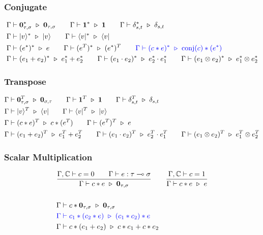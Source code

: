 \subsubsection*{Conjugate}
\begin{align*}
  & \Gamma \vdash \textbf{0}_{\tau, \sigma}^* \ \triangleright\ \textbf{0}_{\tau, \sigma}
  \qquad 
  \Gamma \vdash \mathbf{1}^* \ \triangleright\ \mathbf{1}
  \qquad 
  \Gamma \vdash \delta_{s,t}^* \ \triangleright\ \delta_{s,t}\\
  & \Gamma \vdash \ket{v}^* \ \triangleright\ \ket{v}
  \qquad 
  \Gamma \vdash \bra{v}^* \ \triangleright\ \bra{v} \\
  & \Gamma \vdash (e^*)^*\ \triangleright\ e
  \qquad 
  \Gamma \vdash (e^T)^* \ \triangleright\ (e^*)^T
  \qquad 
  \textcolor{blue}{\Gamma \vdash (c * e)^* \ \triangleright\ \textrm{conj}(c) * (e^*)}\\
  & \Gamma \vdash (e_1 + e_2)^* \ \triangleright\ e_1^* + e_2^* 
  \qquad \Gamma \vdash (e_1 \cdot e_2)^* \ \triangleright\ e_2^* \cdot e_1^* 
  \qquad \Gamma \vdash (e_1 \otimes e_2)^* \ \triangleright\ e_1^* \otimes e_2^*
\end{align*}

\subsubsection*{Transpose}
\begin{align*}
  & \Gamma \vdash \textbf{0}_{\tau, \sigma}^T \ \triangleright\ \textbf{0}_{\sigma, \tau} 
  \qquad \Gamma \vdash \mathbf{1}^T \ \triangleright\ \mathbf{1}
  \qquad \Gamma \vdash \delta_{s,t}^T \ \triangleright\ \delta_{s,t} \\
  & \Gamma \vdash \ket{v}^T \ \triangleright\ \bra{v} 
  \qquad \Gamma \vdash \bra{v}^T \ \triangleright\ \ket{v} \\
  & \Gamma \vdash (c * e)^T \ \triangleright\ c * (e^T)
  \qquad \Gamma \vdash (e^T)^T \ \triangleright\ e\\
  & \Gamma \vdash (e_1 + e_2)^T \ \triangleright\ e_1^T + e_2^T 
  \qquad \Gamma \vdash (e_1 \cdot e_2)^T \ \triangleright\ e_2^T \cdot e_1^T 
  \qquad \Gamma \vdash (e_1 \otimes e_2)^T \ \triangleright\ e_1^T \otimes e_2^T
\end{align*}


\subsubsection*{Scalar Multiplication}
\begin{align*}
  & \frac{\Gamma, \mathbb{C} \vdash c = 0 \qquad \Gamma \vdash e : \tau \multimap \sigma}{\Gamma \vdash c * e \ \triangleright\ \textbf{0}_{\tau, \sigma}}
  \qquad 
  \frac{\Gamma, \mathbb{C} \vdash c = 1 }{\Gamma \vdash c * e \ \triangleright\ e}\\
  &\ \\
  & \Gamma \vdash c * \mathbf{0}_{\tau, \sigma} \ \triangleright\ \mathbf{0}_{\tau, \sigma} \\
  & \textcolor{blue}{\Gamma \vdash c_1 * (c_2 * e) \ \triangleright\ (c_1 * c_2) * e} \\
  & \Gamma \vdash c * (e_1 + e_2) \ \triangleright\ c * e_1 + c * e_2
\end{align*}

